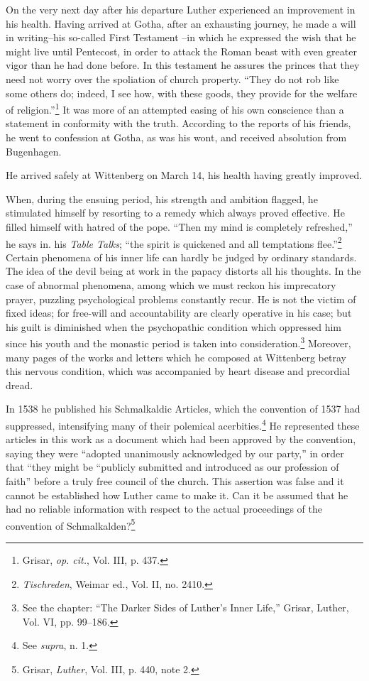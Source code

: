 On the very next day after his departure Luther experienced an
improvement in his health. Having arrived at Gotha, after an exhausting
journey, he made a will in writing--his so-called First Testament
--in which he expressed the wish that he might live until Pentecost, in
order to attack the Roman beast with even greater vigor
than he had done before. In this testament he assures the princes that
they need not worry over the spoliation of church property. “They
do not rob like some others do; indeed, I see how, with these goods,
they provide for the welfare of religion.”\footnote{Grisar, \textit{op. cit.}, Vol. III, p. 437.}
It was more of an attempted
easing of his own conscience than a statement in conformity
with the truth. According to the reports of his friends, he went to
confession at Gotha, as was his wont, and received absolution from
Bugenhagen.

He arrived safely at Wittenberg on March 14, his health having
greatly improved.

When, during the ensuing period, his strength and ambition
flagged, he stimulated himself by resorting to a remedy which always
proved effective. He filled himself with hatred of the pope. “Then
my mind is completely refreshed,” he says in. his \textit{Table Talks}; “the
spirit is quickened and all temptations flee.”\footnote{\textit{Tischreden}, Weimar ed., Vol. II, no. 2410.}
Certain phenomena of
his inner life can hardly be judged by ordinary standards. The idea
of the devil being at work in the papacy distorts all his thoughts. In
the case of abnormal phenomena, among which we must reckon his
imprecatory prayer, puzzling psychological problems constantly recur.
He is not the victim of fixed ideas; for free-will and accountability
are clearly operative in his case; but his guilt is diminished when
the psychopathic condition which oppressed him since his youth and
the monastic period is taken into consideration.\footnote
{See the chapter: “The Darker Sides of Luther’s Inner Life,” Grisar, Luther, Vol. VI,
pp. 99--186.}
Moreover, many
pages of the works and letters which he composed at Wittenberg betray
this nervous condition, which was accompanied by heart disease
and precordial dread.

In 1538 he published his Schmalkaldic Articles, which the convention of
1537 had suppressed, intensifying many of their polemical
acerbities.\footnote{See \textit{supra}, n. 1.}
He represented these articles in this work as a document
which had been approved by the convention, saying they were
“adopted unanimously acknowledged by our party,” in order that
“they might be “publicly submitted and introduced as our profession
of faith” before a truly free council of the church. This assertion was
false and it cannot be established how Luther came to make it. Can it
be assumed that he had no reliable information with respect to the
actual proceedings of the convention of Schmalkalden?\footnote{Grisar, \textit{Luther}, Vol. III, p. 440, note 2.}


